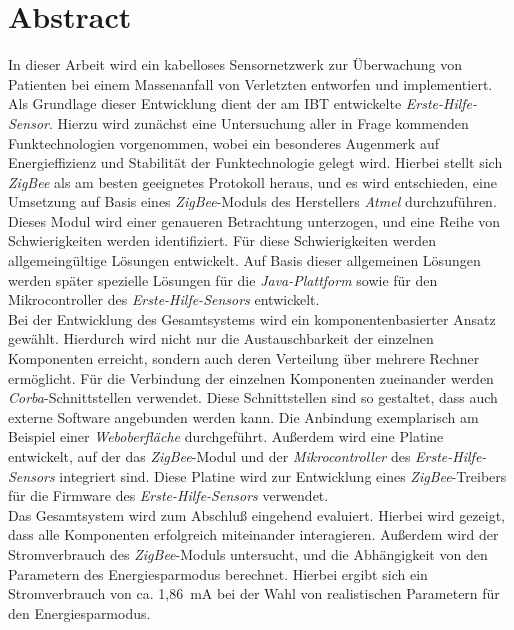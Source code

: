 \chapter*{Abstract}
\begin{small}
In dieser Arbeit wird ein kabelloses Sensornetzwerk zur Überwachung von Patienten bei einem 
Massenanfall von Verletzten entworfen und implementiert. Als Grundlage dieser Entwicklung
dient der am IBT entwickelte \emph{Erste-Hilfe-Sensor}.
Hierzu wird zunächst eine Untersuchung aller in Frage kommenden Funktechnologien vorgenommen,
wobei ein besonderes Augenmerk auf Energieffizienz und Stabilität der Funktechnologie gelegt wird.
Hierbei stellt sich \emph{ZigBee} als am besten geeignetes Protokoll heraus, und es wird entschieden,
eine Umsetzung auf Basis eines \emph{ZigBee}-Moduls des Herstellers \emph{Atmel} durchzuführen. 
Dieses Modul wird einer genaueren Betrachtung unterzogen, und eine Reihe von Schwierigkeiten werden
identifiziert. Für diese Schwierigkeiten werden allgemeingültige Lösungen entwickelt. Auf Basis dieser
allgemeinen Lösungen werden später spezielle Lösungen für die \emph{Java-Plattform} sowie für den
Mikrocontroller des \emph{Erste-Hilfe-Sensors} entwickelt.
\\                    
Bei der Entwicklung des Gesamtsystems wird ein komponentenbasierter Ansatz gewählt. Hierdurch wird nicht
nur die Austauschbarkeit der einzelnen Komponenten erreicht, sondern auch deren Verteilung über
mehrere Rechner ermöglicht. Für die Verbindung der einzelnen Komponenten zueinander werden 
\emph{Corba}-Schnittstellen verwendet. Diese Schnittstellen sind so gestaltet, dass auch externe
Software angebunden werden kann. Die Anbindung exemplarisch am Beispiel einer \emph{Weboberfläche} 
durchgeführt.
Außerdem wird eine Platine entwickelt, auf der das \emph{ZigBee}-Modul und der
\emph{Mikrocontroller} des \emph{Erste-Hilfe-Sensors} integriert sind. Diese Platine wird zur 
Entwicklung eines \emph{ZigBee}-Treibers für die Firmware des \emph{Erste-Hilfe-Sensors} verwendet.
\\
Das Gesamtsystem wird zum Abschluß eingehend evaluiert. Hierbei wird gezeigt, dass alle Komponenten
erfolgreich miteinander interagieren. Außerdem wird der Stromverbrauch des \emph{ZigBee}-Moduls
untersucht, und die Abhängigkeit von den Parametern des Energiesparmodus berechnet. Hierbei ergibt 
sich ein Stromverbrauch von ca. 1,86~mA bei der Wahl von realistischen Parametern für den 
Energiesparmodus.

\end{small}
